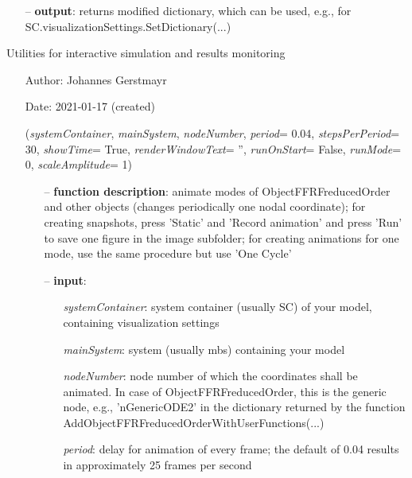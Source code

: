 \begin{itemize}[leftmargin=1.4cm]
\begin{itemize}[leftmargin=0.5cm]
\begin{itemize}[leftmargin=1.4cm]
\begin{itemize}[leftmargin=0.5cm]
\begin{itemize}[leftmargin=1.4cm]
\begin{itemize}[leftmargin=0.5cm]
\begin{itemize}[leftmargin=1.4cm]
\begin{itemize}[leftmargin=0.7cm]
\begin{itemize}[leftmargin=1.2cm]
  \end{itemize}
  \item[--]  {\bf output}: returns modified dictionary, which can be used, e.g., for SC.visualizationSettings.SetDictionary(...)\vspace{12pt}\end{itemize}
%
\label{sec:module:interactive}
  Utilities for interactive simulation and results monitoring
\begin{itemize}[leftmargin=1.4cm]
\setlength{\itemindent}{-1.4cm}
\item[]Author:    Johannes Gerstmayr
\item[]Date:      2021-01-17 (created)
\ei
\begin{flushleft}
\label{sec:interactive:AnimateModes}
({\it systemContainer}, {\it mainSystem}, {\it nodeNumber}, {\it period}= 0.04, {\it stepsPerPeriod}= 30, {\it showTime}= True, {\it renderWindowText}= '', {\it runOnStart}= False, {\it runMode}= 0, {\it scaleAmplitude}= 1)
\end{flushleft}
\setlength{\itemindent}{0.7cm}
\begin{itemize}[leftmargin=0.7cm]
  \item[--]  {\bf function description}: animate modes of ObjectFFRFreducedOrder and other objects (changes periodically one nodal coordinate); for creating snapshots, press 'Static' and 'Record animation' and press 'Run' to save one figure in the image subfolder; for creating animations for one mode, use the same procedure but use 'One Cycle'  \item[--]  {\bf input}: \vspace{-6pt}
  \begin{itemize}[leftmargin=1.2cm]
\setlength{\itemindent}{-0.7cm}
    \item[] {\it systemContainer}: system container (usually SC) of your model, containing visualization settings
    \item[] {\it     mainSystem}: system (usually mbs) containing your model
    \item[] {\it     nodeNumber}: node number of which the coordinates shall be animated. In case of ObjectFFRFreducedOrder, this is the generic node, e.g., 'nGenericODE2' in the dictionary returned by the function AddObjectFFRFreducedOrderWithUserFunctions(...)
    \item[] {\it     period}: delay for animation of every frame; the default of 0.04 results in approximately 25 frames per second

\end{itemize}
\end{itemize}
\end{itemize}
\end{itemize}
\end{itemize}
\end{itemize}
\end{itemize}
\end{itemize}
\end{itemize}
\end{itemize}

